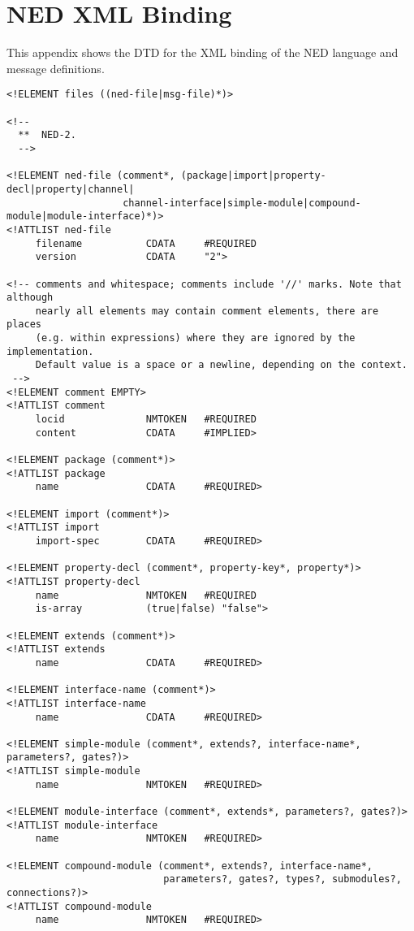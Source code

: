 \chapter{NED XML Binding}
\label{cha:ned-xml-binding}

This appendix shows the DTD for the XML binding of the NED language and
message definitions.

\begin{verbatim}
<!ELEMENT files ((ned-file|msg-file)*)>

<!--
  **  NED-2.
  -->

<!ELEMENT ned-file (comment*, (package|import|property-decl|property|channel|
                    channel-interface|simple-module|compound-module|module-interface)*)>
<!ATTLIST ned-file
     filename           CDATA     #REQUIRED
     version            CDATA     "2">

<!-- comments and whitespace; comments include '//' marks. Note that although
     nearly all elements may contain comment elements, there are places
     (e.g. within expressions) where they are ignored by the implementation.
     Default value is a space or a newline, depending on the context.
 -->
<!ELEMENT comment EMPTY>
<!ATTLIST comment
     locid              NMTOKEN   #REQUIRED
     content            CDATA     #IMPLIED>

<!ELEMENT package (comment*)>
<!ATTLIST package
     name               CDATA     #REQUIRED>

<!ELEMENT import (comment*)>
<!ATTLIST import
     import-spec        CDATA     #REQUIRED>

<!ELEMENT property-decl (comment*, property-key*, property*)>
<!ATTLIST property-decl
     name               NMTOKEN   #REQUIRED
     is-array           (true|false) "false">

<!ELEMENT extends (comment*)>
<!ATTLIST extends
     name               CDATA     #REQUIRED>

<!ELEMENT interface-name (comment*)>
<!ATTLIST interface-name
     name               CDATA     #REQUIRED>

<!ELEMENT simple-module (comment*, extends?, interface-name*, parameters?, gates?)>
<!ATTLIST simple-module
     name               NMTOKEN   #REQUIRED>

<!ELEMENT module-interface (comment*, extends*, parameters?, gates?)>
<!ATTLIST module-interface
     name               NMTOKEN   #REQUIRED>

<!ELEMENT compound-module (comment*, extends?, interface-name*,
                           parameters?, gates?, types?, submodules?, connections?)>
<!ATTLIST compound-module
     name               NMTOKEN   #REQUIRED>


\end{verbatim}
